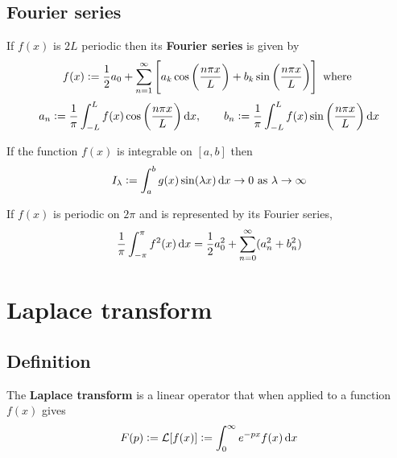 \documentclass[../Year1.tex]{subfiles}
\begin{document}
\subsection{Fourier series}
\begin{definition}
    If $f(x)$ is $2L$ periodic then its \textbf{Fourier series} is given by \[
        f(x) := \frac{1}{2}a_0 + \sum_{n=1}^\infty\left[a_k\cos\br{\frac{n\pi x}{L}}+b_k\sin\br{\frac{n\pi x}{L}}\right] \ \text{\textcolor{black}{where }}\]\[ a_n := \frac{1}{\pi}\intd{-L}{L}{f(x)\cos\br{\frac{n\pi x}{L}}}{x}, \qquad b_n := \frac{1}{\pi}\intd{-L}{L}{f(x)\sin\br{\frac{n\pi x}{L}}}{x}
    \]
    
\end{definition}

\begin{lemma}
    If the function $f(x)$ is integrable on $[a,b]$ then \[
        I_\lambda := \intd{a}{b}{g(x)\sin(\lambda x)}{x}\rightarrow 0 \ \text{\textcolor{black}{as }}\lambda\rightarrow\infty
    \]
\end{lemma}

\begin{theorem}[Paerseval's]
    If $f(x)$ is periodic on $2\pi$ and is represented by its Fourier series, \[
        \frac{1}{\pi}\intd{-\pi}{\pi}{f^2(x)}{x} = \frac{1}{2}a_0^2 + \sum_{n=0}^\infty(a_n^2+b_n^2)
    \]
\end{theorem}

\section{Laplace transform}

\subsection{Definition}

\begin{definition}
    The \textbf{Laplace transform} is a linear operator that when applied to a function $f(x)$ gives \[
        F(p) := \LLL[f(x)] := \intd{0}{\infty}{e^{-px}f(x)}{x}
    \]
\end{definition}
\end{document}
